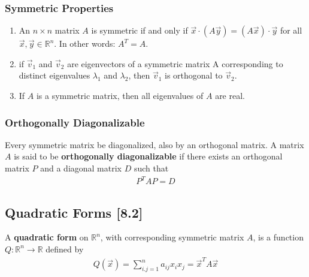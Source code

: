 \documentclass[a4paper,9pt]{extarticle}
\begin{document}
\begin{multicols*}{2}
\subsubsection{Symmetric Properties}
\begin{enumerate}[label=\bfseries (\arabic*)] \itemsep0pt \parskip0pt
    \item An $n \times n$ matrix $A$ is symmetric if and only if $\vec{x} \cdot (A \vec{y}) = (A \vec{x}) \cdot \vec{y}$ for all $\vec{x}, \vec{y} \in \mathbb{R}^n$. In other words: $A^T = A$.
    \item if $\vec{v}_1$ and $\vec{v}_2$ are eigenvectors of a symmetric matrix A corresponding to distinct eigenvalues $\lambda_1$ and $\lambda_2$, then $\vec{v}_1$ is orthogonal to $\vec{v}_2$.
    \item If $A$ is a symmetric matrix, then all eigenvalues of $A$ are real.
\end{enumerate}


\subsubsection{Orthogonally Diagonalizable}
Every symmetric matrix be diagonalized, also by an orthogonal matrix. A matrix $A$ is said to be \textbf{orthogonally diagonalizable} if there exists an orthogonal matrix $P$ and a diagonal matrix $D$ such that
\begin{equation} \label{8.1-1}
    \begin{split}
        P^T A P = D
    \end{split}
\end{equation}


\subsection{Quadratic Forms [8.2]}
A \textbf{quadratic form} on $\mathbb{R}^n$, with corresponding symmetric matrix $A$, is a function $Q : \mathbb{R}^n \to \mathbb{R}$ defined by
\begin{equation} \label{8.2-1}
    \begin{split}
        Q(\vec{x}) = \sum_{i.j = 1}^{n} a_{ij} x_i x_j = \vec{x}^T A \vec{x}
    \end{split}
\end{equation}



\end{multicols*}
\end{document}
